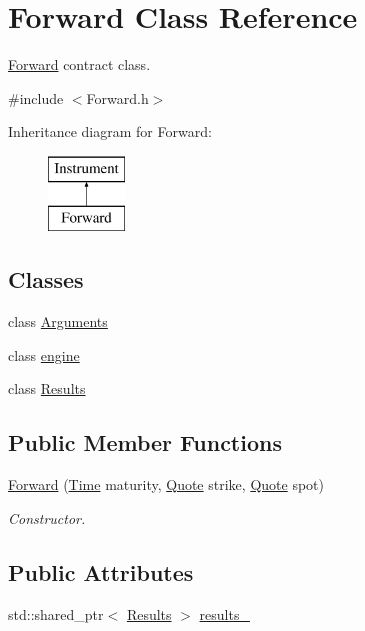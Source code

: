 \hypertarget{class_forward}{}\section{Forward Class Reference}
\label{class_forward}


\hyperlink{class_forward}{Forward} contract class.  




{\ttfamily \#include $<$Forward.\+h$>$}

Inheritance diagram for Forward\+:\begin{figure}[H]
\begin{center}
\leavevmode
\includegraphics[height=2.000000cm]{class_forward}
\end{center}
\end{figure}
\subsection*{Classes}
\begin{DoxyCompactItemize}
\item 
class \hyperlink{class_forward_1_1_arguments}{Arguments}
\item 
class \hyperlink{class_forward_1_1engine}{engine}
\item 
class \hyperlink{class_forward_1_1_results}{Results}
\end{DoxyCompactItemize}
\subsection*{Public Member Functions}
\begin{DoxyCompactItemize}
\item 
\hyperlink{class_forward_a7ec14e1a089290cae0e70c4cddd353b5}{Forward} (\hyperlink{_name_def_8h_ac2d3e0ba793497bcca555c7c2cf64ff3}{Time} maturity, \hyperlink{_name_def_8h_a642a6c5fd87319d922637de0e0bb0305}{Quote} strike, \hyperlink{_name_def_8h_a642a6c5fd87319d922637de0e0bb0305}{Quote} spot)
\begin{DoxyCompactList}\small\item\em Constructor. \end{DoxyCompactList}\end{DoxyCompactItemize}
\subsection*{Public Attributes}
\begin{DoxyCompactItemize}
\item 
std\+::shared\+\_\+ptr$<$ \hyperlink{class_forward_1_1_results}{Results} $>$ \hyperlink{class_forward_abead12e748980177fb67f98bcffbf817}{results\+\_\+}
\end{DoxyCompactItemize}

